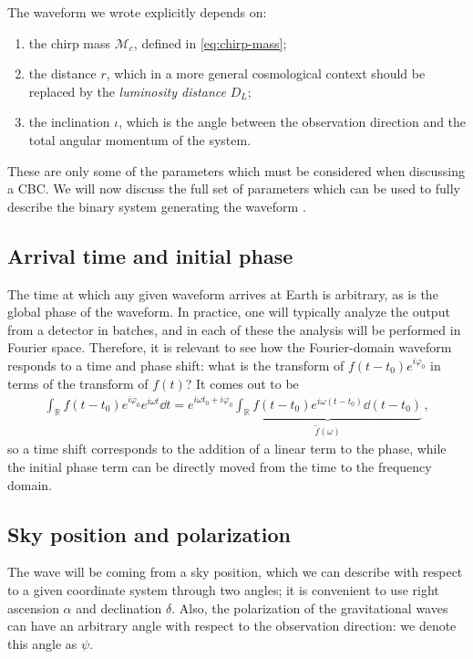 \documentclass[main.tex]{subfiles}
\begin{document}
The waveform we wrote explicitly depends on: 
\begin{enumerate}
    \item the chirp mass \(\mathcal{M}_c\), defined in \eqref{eq:chirp-mass};
    \item the distance \(r\), which in a more general cosmological context should be replaced by the \emph{luminosity distance} \(D_L\);
    \item the inclination \(\iota \), which is the angle between the observation direction and the total angular momentum of the system.
\end{enumerate}

These are only some of the parameters which must be considered when discussing a \ac{CBC}. We will now discuss the full set of parameters which can be used to fully describe the binary system generating the waveform \cite[eq.\ 21]{breschiTtBajesBayesian2021}. 

\subsection{Arrival time and initial phase} \label{sec:arrival-time}

The time at which any given waveform arrives at Earth is arbitrary, as is the global phase of the waveform. 
In practice, one will typically analyze the output from a detector in batches, and in each of these the analysis will be performed in Fourier space. 
Therefore, it is relevant to see how the Fourier-domain waveform responds to a time and phase shift: what is the transform of \(f(t-t_0 ) e^{i \varphi_0} \) in terms of the transform of \(f(t)\)? It comes out to be 
%
\begin{align}
\int_{\mathbb{R}} f(t-t_0 ) e^{i \varphi_0 } e^{i \omega t} \dd{t}  = e^{i \omega t_0 + i \varphi_0} \underbrace{\int_{\mathbb{R}} f(t-t_0 ) e^{i \omega (t-t_0 )} \dd{(t-t_0 )}}_{\widetilde{f}(\omega )}
\,,
\end{align}
%
so a time shift corresponds to the addition of a linear term to the phase, while the initial phase term can be directly moved from the time to the frequency domain. 

\subsection{Sky position and polarization} \label{sec:sky-pos-polar}

The wave will be coming from a sky position, which we can describe with respect to a given coordinate system through two angles; it is convenient to use right ascension \(\alpha \) and declination \(\delta \). 
Also, the polarization of the gravitational waves can have an arbitrary angle with respect to the observation direction: we denote this angle as \(\psi \). 
\end{document}
